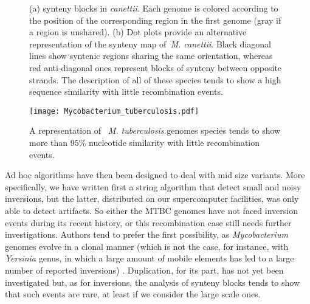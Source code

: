 \documentclass[runningheads,a4paper]{llncs}
\begin{document}
\begin{figure}[!htb]
\begin{minipage}{.5\linewidth}
\centering
{}
\end{minipage}%
\begin{minipage}{.5\linewidth}
\centering
{}
\end{minipage}\par\medskip
\centering
\caption{(a) synteny blocks in \textit{canettii}. Each genome is colored according to the position of the corresponding region in the first genome (gray if a region is unshared).
(b) Dot plots provide an alternative representation of the synteny map of~\textit{M.  canettii}. Black diagonal lines show syntenic regions sharing the same orientation, whereas red anti-diagonal ones represent blocks of synteny between opposite strands.
The description of all of these species tends to show a high sequence similarity with little recombination events.}
\label{fig:canettii_Barplot}
\end{figure}


\begin{figure}[!htb]
\centering
\texttt{[image: Mycobacterium\_tuberculosis.pdf]}
\caption{A representation of ~\textit{M. tuberculosis} genomes species tends to show  more than $95\%$ nucleotide similarity with little recombination events.} 
\label{fig:M.tuberculosis_1}
\end{figure}

Ad hoc algorithms have then been designed to deal with mid size variants. More specifically, we have written first a string algorithm that detect small and noisy inversions, but the latter, distributed on our supercomputer facilities, was only able to detect artifacts. So either the MTBC genomes have not faced inversion events during its recent history, or this recombination case still needs further investigations. Authors tend to prefer the first possibility, as \textit{Mycobacterium} genomes evolve in a clonal manner (which is not the case, for instance, with \textit{Yersinia} genus, in which a large amount of mobile elements has led to a large number of reported inversions) \cite{behr2013evolution}. Duplication, for its part, has not yet been investigated but, as for inversions, the analysis of synteny blocks tends to show that such events are rare, at least if we consider the large scale ones.
\end{document}
